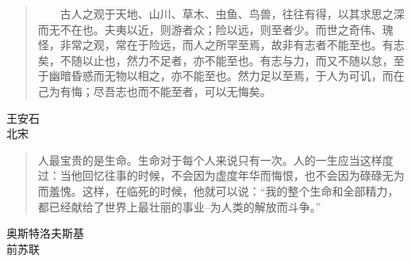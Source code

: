 \begin{quote}
　　古人之观于天地、山川、草木、虫鱼、鸟兽，往往有得，以其求思之深而无不在也。夫夷以近，则游者众；险以远，则至者少。而世之奇伟、瑰怪，非常之观，常在于险远，而人之所罕至焉，故非有志者不能至也。有志矣，不随以止也，然力不足者，亦不能至也。有志与力，而又不随以怠，至于幽暗昏惑而无物以相之，亦不能至也。然力足以至焉，于人为可讥，而在己为有悔；尽吾志也而不能至者，可以无悔矣。
\end{quote}


\begin{flushright}
王安石\\
北宋
\end{flushright}


\begin{quote}
人最宝贵的是生命。生命对于每个人来说只有一次。人的一生应当这样度过：当他回忆往事的时候，不会因为虚度年华而悔恨，也不会因为碌碌无为而羞愧。这样，在临死的时候，他就可以说：“我的整个生命和全部精力，都已经献给了世界上最壮丽的事业--为人类的解放而斗争。” 
\end{quote}


\begin{flushright}
奥斯特洛夫斯基\\
前苏联
\end{flushright}
